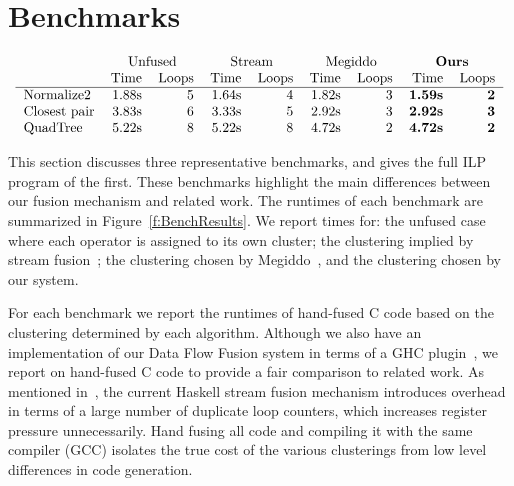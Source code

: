 \section{Benchmarks}
\label{s:Benchmarks}

\begin{figure*}
$$\begin{array}{c}

\begin{tabular}{lrrrrrrrr}
                &   \multicolumn{2}{c}{Unfused}         & \multicolumn{2}{c}{Stream}
                & \multicolumn{2}{c}{Megiddo} &\multicolumn{2}{c}{\textbf{Ours}} \\
                & Time & Loops   & Time & Loops      & Time & Loops & Time & Loops   \\
\hline
Normalize2      & 1.88s & 5      & 1.64s & 4          & 1.82s & 3  & \textbf{1.59s} & \textbf{2}\\
Closest pair    & 3.83s & 6      & 3.33s & 5          & 2.92s & 3  & \textbf{2.92s} & \textbf{3}\\
QuadTree        & 5.22s & 8      & 5.22s & 8          & 4.72s & 2  & \textbf{4.72s} & \textbf{2}\\
\end{tabular}

\end{array}$$
\caption{Benchmark results}
\label{f:BenchResults}
\end{figure*}

This section discusses three representative benchmarks, and gives the full ILP program of the first. These benchmarks highlight the main differences between our fusion mechanism and related work. The runtimes of each benchmark are summarized in Figure~\ref{f:BenchResults}. We report times for: the unfused case where each operator is assigned to its own cluster; the clustering implied by stream fusion~\cite{coutts2007streamfusion}; the clustering chosen by Megiddo~\cite{megiddo1998optimal}, and the clustering chosen by our system. 

For each benchmark we report the runtimes of hand-fused C code based on the clustering determined by each algorithm. Although we also have an implementation of our Data Flow Fusion system in terms of a GHC plugin~\cite{lippmeier2013flow}, we report on hand-fused C code to provide a fair comparison to related work. As mentioned in~\cite{lippmeier2013flow}, the current Haskell stream fusion mechanism introduces overhead in terms of a large number of duplicate loop counters, which increases register pressure unnecessarily. Hand fusing all code and compiling it with the same compiler (GCC) isolates the true cost of the various clusterings from low level differences in code generation.

